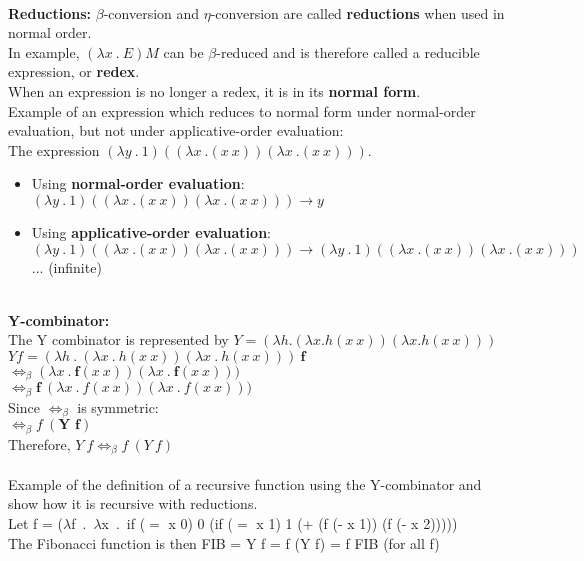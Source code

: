 \documentclass[11pt]{article}
\begin{document}
\\ \textbf{Reductions:}
$\beta$-conversion and $\eta$-conversion are called \textbf{reductions} when used in normal order.
\\ In example, $(\lambda x\ .\ E)M$ can be $\beta$-reduced and is therefore called a reducible expression, or \textbf{redex}.
\\ When an expression is no longer a redex, it is in its \textbf{normal form}.
\\ Example of an expression which reduces to normal form under normal-order evaluation, but not under applicative-order evaluation:
\\ The expression $(\lambda y\ .\ 1)((\lambda x\ .(x\ x))(\lambda x\ .(x\ x)))$.
\begin{itemize}
    \item Using \textbf{normal-order evaluation}:
    \\ $(\lambda y\ .\ 1)((\lambda x\ .(x\ x))(\lambda x\ .(x\ x))) \rightarrow y$
    \item Using \textbf{applicative-order evaluation}:
    \\ $(\lambda y\ .\ 1)((\lambda x\ .(x\ x))(\lambda x\ .(x\ x))) \rightarrow (\lambda y\ .\ 1)((\lambda x\ .(x\ x))(\lambda x\ .(x\ x)))$ ... (infinite) 
\end{itemize}
\\ \textbf{Y-combinator:}
\\ The Y combinator is represented by 
$Y = (\lambda h.(\lambda x . h(x\ x))(\lambda x.h(x\ x)))$
\\ $Y f = (\lambda h\ .\ (\lambda x\ .\ h(x\ x))(\lambda x\ .\ h(x\ x)))\ \textbf{f}$
\\ $ \Leftrightarrow_\beta (\lambda x\ .\ \textbf{f}(x\ x))(\lambda x\ .\ \textbf{f}(x\ x)))$
\\ $ \Leftrightarrow_\beta \textbf{f}\ (\lambda x\ .\ f(x\ x))(\lambda x\ .\ f(x\ x)))$
\\ Since $\Leftrightarrow_\beta$ is symmetric:
\\ $ \Leftrightarrow_\beta f\ (\textbf{Y f})$
\\ Therefore, $Y\ f \Leftrightarrow_\beta f\ (Y\ f)$
\\\\ Example of the definition of a recursive function using the Y-combinator and show how it is recursive with reductions.
\\ Let f = ($\lambda$f\ .\ $\lambda$x\ .\ if ($=$ x 0) 0 (if ($=$ x 1) 1 (+ (f (- x 1)) (f (- x 2)))))
\\ The Fibonacci function is then FIB = Y f = f (Y f) = f FIB (for all f)
\end{document}
